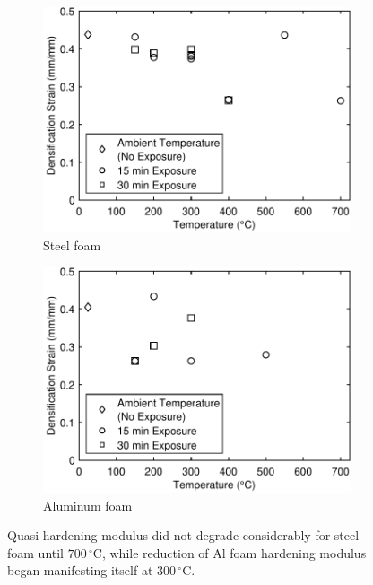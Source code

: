 \documentclass[review]{elsarticle}
\begin{document}
{\begin{figure}
	\centering
	\begin{subfigure}{0.50\textwidth}
		\centering
		\includegraphics[width=0.90\linewidth]
		{Tex-Figures/Fig19a-densification-Fe.pdf}
		\caption{Steel foam}
		\label{fig:densification_Steel}
	\end{subfigure}%
	\begin{subfigure}{0.50\textwidth}
		\centering
		\includegraphics[width=0.90\linewidth]
		{Tex-Figures/Fig19b-densification-Al.pdf}
		\caption{Aluminum foam}
		\label{fig:densifiation_Al}
	\end{subfigure}
	\caption{ Quasi-hardening modulus did not degrade considerably for steel foam until $700\,^{\circ}\mathrm{C}$, while reduction of Al foam hardening modulus began manifesting itself at $300\,^{\circ}\mathrm{C}$.}
	\label{fig:densification-modulus}
\end{figure}


}
\end{document}
